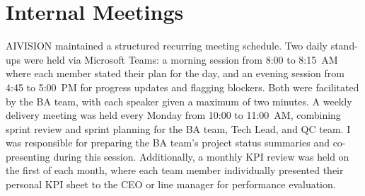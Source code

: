 \section{Internal Meetings}
\label{sec:meetings}

AIVISION maintained a structured recurring meeting schedule. Two daily stand-ups were held via Microsoft Teams: a morning session from 8:00 to 8:15~AM where each member stated their plan for the day, and an evening session from 4:45 to 5:00~PM for progress updates and flagging blockers. Both were facilitated by the BA team, with each speaker given a maximum of two minutes. A weekly delivery meeting was held every Monday from 10:00 to 11:00~AM, combining sprint review and sprint planning for the BA team, Tech Lead, and QC team. I was responsible for preparing the BA team's project status summaries and co-presenting during this session. Additionally, a monthly KPI review was held on the first of each month, where each team member individually presented their personal KPI sheet to the CEO or line manager for performance evaluation.
